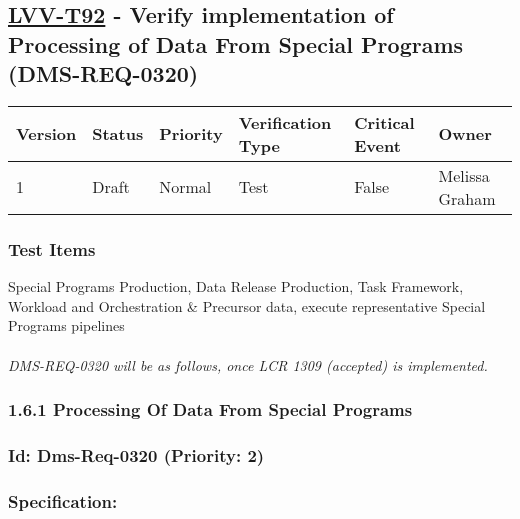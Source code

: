 \hypertarget{lvv-t92---verify-implementation-of-processing-of-data-from-special-programs-dms-req-0320}{%
\subsection{\texorpdfstring{\href{https://jira.lsstcorp.org/secure/Tests.jspa\#/testCase/LVV-T92}{LVV-T92}
- Verify implementation of Processing of Data From Special Programs
(DMS-REQ-0320)}{LVV-T92 - Verify implementation of Processing of Data From Special Programs (DMS-REQ-0320)}}\label{lvv-t92---verify-implementation-of-processing-of-data-from-special-programs-dms-req-0320}}

\begin{longtable}[]{@{}llllll@{}}
\toprule
Version & Status & Priority & Verification Type & Critical Event &
Owner\tabularnewline
\midrule
\endhead
1 & Draft & Normal & Test & False & Melissa Graham\tabularnewline
\bottomrule
\end{longtable}

\hypertarget{test-items-68}{%
\subsubsection{Test Items}\label{test-items-68}}

Special Programs Production, Data Release Production, Task Framework,
Workload and Orchestration \& Precursor data, execute representative
Special Programs pipelines\\
~\\
\emph{DMS-REQ-0320 will be as follows, once LCR 1309 (accepted) is
implemented.\\
}

\hypertarget{processing-of-data-from-special-programs}{%
\subsubsection{1.6.1 Processing Of Data From Special
Programs}\label{processing-of-data-from-special-programs}}

\hypertarget{id-dms-req-0320-priority-2}{%
\subsubsection{Id: Dms-Req-0320 (Priority:
2)}\label{id-dms-req-0320-priority-2}}

\hypertarget{specification}{%
\subsubsection{Specification:~}\label{specification}}

